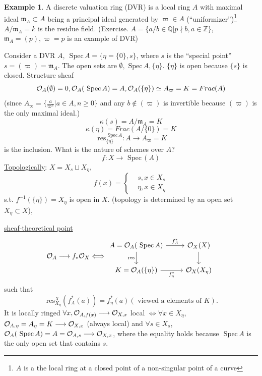 \documentclass[11pt]{article}
\theoremstyle{definition}
\newtheorem{ex}[thm]{Example}
\newcommand{\spec}{\text{ Spec}\,}
\newcommand{\res}{\text{ res}}
\newcommand{\intg}{\mathbb Z}
\newcommand{\ratl}{\mathbb Q}
\newcommand{\scm}{{\mathfrak m}}
\newcommand{\calo}{{\cal O}}
\newcommand{\lrta}{\longrightarrow}
\newcommand{\Llrta}{\Longleftrightarrow}
\begin{document}
\begin{ex}
A discrete valuation ring (DVR) is a local ring $A$ with maximal ideal $\scm_A\subset A$ being a principal ideal generated by $\varpi\in A$ (``uniformizer'')\footnote{$A$ is a the local ring at a closed point of  a non-singular point of a curve}
$A/\scm_A=k$ is the residue field. (Exercise. $A=\{a/b\in \ratl|p\nmid b,a\in \intg\}$, $\scm_A=(p),\varpi =p$ is an example of DVR)

Consider a DVR $A$, $\spec A=\{\eta=\{0\},s\}$, where $s$ is  the ``special point'' $s=(\varpi)=\scm_A$. The open sets are $\emptyset, \spec A, \{\eta\}$. $\{\eta\}$ is open because $\{s\}$ is closed. Structure sheaf
$$
\calo_A(\emptyset)=0,\calo_A(\spec A)=A, \calo_A(\{\eta\})\simeq A_\varpi=K=Frac(A)
$$
(since $A_\varpi=\{\frac{a}{\varpi^n}| a\in A, n\geq 0\}$ and any $b\notin (\varpi) $ is invertible because $(\varpi)$ is the only maximal ideal.)
$$
\kappa(s)=A/\scm_A=K
$$
$$
\kappa(\eta)=Frac(A/\{0\})=K
$$
$$
\res^{\spec A}_{\{\eta\}}:A\lrta A_\varpi=K
$$
is the inclusion. What is the nature of schemes over $A$?
$$
f:X\lrta \spec(A)
$$
\underline{Topologically}: $X=X_s\sqcup X_\eta$,
$$
f(x)=\left\{\begin{aligned}
&s, x\in X_s\\
& \eta, x\in X_\eta
\end{aligned}\right.
$$
s.t. $f^{-1}(\{\eta\})=X_\eta$ is open in $X$. (topology is determined by an open set $X_\eta\subset X$),

\underline{sheaf-theoretical point}
$$
\calo_A\lrta f_*\calo_X\Llrta \begin{tikzcd}
A=\calo_A(\spec A) \arrow[r, "f^*_A"] \arrow[d, "\res"'] & \calo_X(X) \arrow[d] \\
K=\calo_A(\{\eta\}) \arrow[r, "f^*_\eta"'] & \calo_X(X_\eta)
\end{tikzcd}
$$
such that 
$$
\res^X_{X_\eta}(f^*_A(a))=f^*_\eta(a)(\text{ viewed a elements of }K).
$$
It is locally ringed $\forall x, \calo_{A,f(x)}\lrta \calo_{X,x}$ local $\Llrta \forall x\in X_\eta$, $\calo_{A,\eta}=A_\eta=K\lrta \calo_{X,x}$ (always local) and 
$\forall s\in X_s$, $\calo_A(\spec A)=A=\calo_{A,s}\lrta \calo_{X,x}$, where the equality holds because $\spec A$ is the only open set that contains $s$.
\end{ex}
\end{document}
